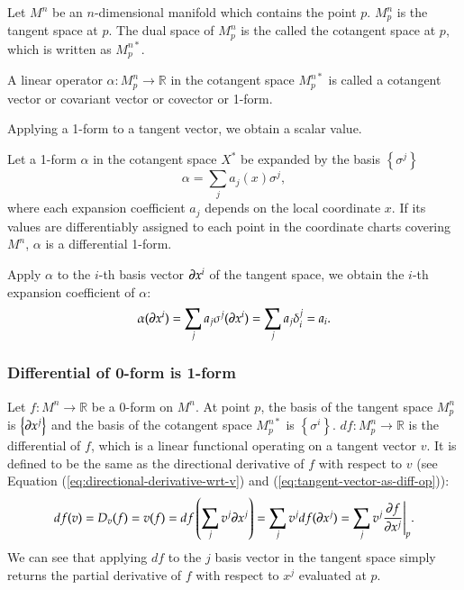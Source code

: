 \documentclass[11pt, a4paper]{book}
\begin{document}
\begin{Definition}
  Let $M^n$ be an $n$-dimensional manifold which contains the point $p$. $M_p^n$ is the
  tangent space at $p$. The dual space of $M_p^n$ is the called the cotangent space at
  $p$, which is written as $M_p^{n*}$.
\end{Definition}

\begin{Definition}
  A linear operator $\alpha: M_p^n \rightarrow \mathbb{R}$ in the cotangent space
  $M_p^{n*}$ is called a cotangent vector or covariant vector or covector or 1-form.
\end{Definition}
Applying a 1-form to a tangent vector, we obtain a scalar value.

\begin{Definition}
  Let a 1-form $\alpha$ in the cotangent space $X^{*}$ be expanded by the basis $\left\{
    \sigma^j \right\}$
  \begin{equation*}
    \alpha = \sum_j a_j(x) \sigma^j,
  \end{equation*}
  where each expansion coefficient $a_j$ depends on the local coordinate $x$. If its
  values are differentiably assigned to each point in the coordinate charts covering
  $M^n$, $\alpha$ is a differential 1-form.
\end{Definition}

Apply $\alpha$ to the $i$-th basis vector $\boldsymbol{\partial}x^i$ of the tangent space, we
obtain the $i$-th expansion coefficient of $\alpha$:
\begin{equation}
  \label{eq:apply-1-form-to-basis}
  \alpha(\boldsymbol{\partial}x^i) = \sum_j a_j \sigma^j(\boldsymbol{\partial}x^i) = \sum_j a_j
  \delta^j_i = a_i.
\end{equation}

\subsubsection{Differential of 0-form is 1-form}

Let $f: M^n \rightarrow \mathbb{R}$ be a 0-form on $M^n$. At point $p$, the basis of the
tangent space $M_p^n$ is $\left\{ \boldsymbol{\partial}x^j \right\}$ and the basis of the
cotangent space $M_p^{n*}$ is $\left\{ \sigma^i \right\}$.
$df: M_p^n \rightarrow \mathbb{R}$ is the differential of $f$, which is a linear
functional operating on a tangent vector $v$. It is defined to be the same as the
directional derivative of $f$ with respect to $v$ (see Equation
(\ref{eq:directional-derivative-wrt-v}) and (\ref{eq:tangent-vector-as-diff-op})):
\begin{equation}
  \label{eq:df-and-directional-derivative}
  df(v) = D_v(f) = v(f) = df \left( \sum_j v^j \boldsymbol{\partial}x^j \right) = \sum_j v^j
  df(\boldsymbol{\partial}x^j) = \sum_j v^j \frac{\partial f}{\partial x^j}\Bigg\vert_p.
\end{equation}
We can see that applying $df$ to the $j$ basis vector in the tangent space simply returns
the partial derivative of $f$ with respect to $x^j$ evaluated at $p$.
\end{document}
